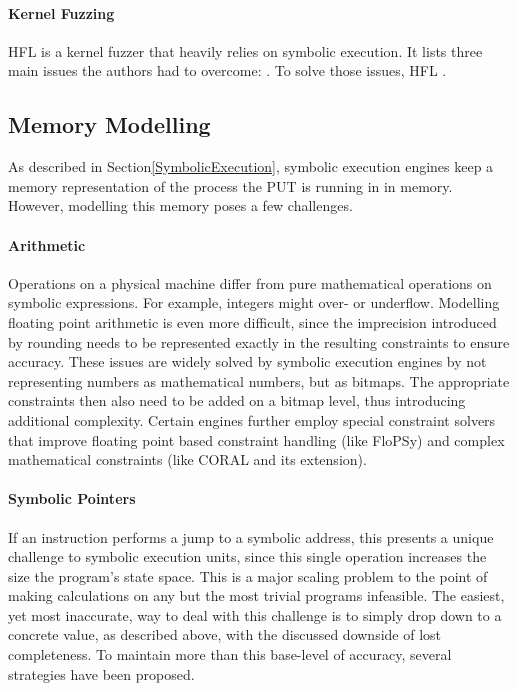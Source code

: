 \documentclass{article}
\begin{document}
\begin{multicols}{2}
  \paragraph{Kernel Fuzzing}
  HFL\cite{HFL} is a kernel fuzzer that heavily relies on symbolic execution. It lists three main issues the authors had to overcome: \cite{HFL}. To solve those issues, HFL \cite{HFL}.

  \subsection{Memory Modelling}
  As described in Section\ref{SymbolicExecution}, symbolic execution engines keep a memory representation of the process the PUT is running in in memory. However, modelling this memory poses a few challenges.

  \paragraph{Arithmetic}
  Operations on a physical machine differ from pure mathematical operations on symbolic expressions. For example, integers might over- or underflow. Modelling floating point arithmetic is even more difficult, since the imprecision introduced by rounding needs to be represented exactly in the resulting constraints to ensure accuracy. These issues are widely solved by symbolic execution engines by not representing numbers as mathematical numbers, but as bitmaps. The appropriate constraints then also need to be added on a bitmap level, thus introducing additional complexity. Certain engines further employ special constraint solvers that improve floating point based constraint handling (like FloPSy\cite{FloPSy}) and complex mathematical constraints (like CORAL\cite{CORAL} and its extension\cite{CORALAVM}).

  \paragraph{Symbolic Pointers}
  If an instruction performs a jump to a symbolic address, this presents a unique challenge to symbolic execution units, since this single operation increases the size the program's state space. This is a major scaling problem to the point of making calculations on any but the most trivial programs infeasible. The easiest, yet most inaccurate, way to deal with this challenge is to simply drop down to a concrete value, as described above, with the discussed downside of lost completeness. To maintain more than this base-level of accuracy, several strategies have been proposed.


\end{multicols}
\end{document}
